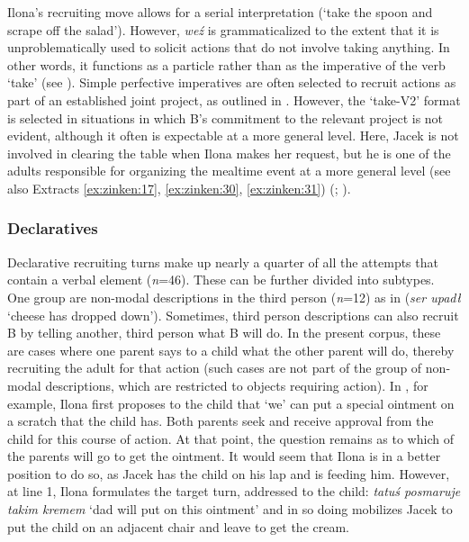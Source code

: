 \documentclass[output=paper]{langsci/langscibook}
\begin{document}
Ilona’s recruiting move allows for a serial interpretation (`take the spoon and scrape off the salad'). However, \textit{weź} is grammaticalized to the extent that it is unproblematically used to solicit actions that do not involve taking anything. In other words, it functions as a particle rather than as the imperative of the verb ‘take’ (see \citealt[chap. 7]{Zinken2016}).  Simple perfective imperatives are often selected to recruit actions as part of an established joint project, as outlined in . However, the ‘take-V2’ format is selected in situations in which B’s commitment to the relevant project is not evident, although it often is expectable at a more general level. Here, Jacek is not involved in clearing the table when Ilona makes her request, but he is one of the adults responsible for organizing the mealtime event at a more general level (see also Extracts \ref{ex:zinken:17}, \ref{ex:zinken:30}, \ref{ex:zinken:31}) (\citealt[chap. 7]{Zinken2016}; \citealt{ZinkenDeppermann2017}).

\subsubsection{Declaratives}\label{sec:zinken:3.3.2}

Declarative recruiting turns make up nearly a quarter of all the attempts that contain a verbal element (\textit{n}=46). These can be further divided into subtypes. One group are non-modal descriptions in the third person (\textit{n}=12) as in  (\textit{ser upadł} ‘cheese has dropped down’). Sometimes, third person descriptions can also recruit B by telling another, third person what B will do.  In the present corpus, these are cases where one parent says to a child what the other parent will do, thereby recruiting the adult for that action (such cases are not part of the group of non-modal descriptions, which are restricted to objects requiring action).  In , for example, Ilona first proposes to the child that ‘we’ can put a special ointment on a scratch that the child has.  Both parents seek and receive approval from the child for this course of action.  At that point, the question remains as to which of the parents will go to get the ointment.  It would seem that Ilona is in a better position to do so, as Jacek has the child on his lap and is feeding him.  However, at line 1, Ilona formulates the target turn, addressed to the child: \textit{tatuś posmaruje takim kremem} ‘dad will put on this ointment’ and in so doing mobilizes Jacek to put the child on an adjacent chair and leave to get the cream.
\end{document}
